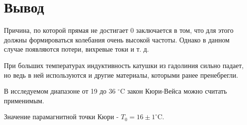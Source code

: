 \documentclass[a4paper]{article}
\theoremstyle{definition}
\theoremstyle{remark}
\begin{document}
\section{Вывод}

\noindent Причина, по которой прямая не достигает 0 заключается в том, что для этого должны формироваться колебания очень высокой частоты. Однако в данном случае появляются потери, вихревые токи и т. д. \medskip

\noindent При больших температурах индуктивность катушки из гадолиния сильно падает, но ведь в ней используются и другие материалы, которыми ранее пренебрегли. \medskip

\noindent В исследуемом диапазоне от 19 до 36 $^\circ \mathrm{C}$ закон Кюри-Вейса можно считать применимым.   \medskip

\noindent Значение парамагнитной точки Кюри - $T_0 = 16 \pm 1 ^\circ \mathrm{C}$.
\end{document}
